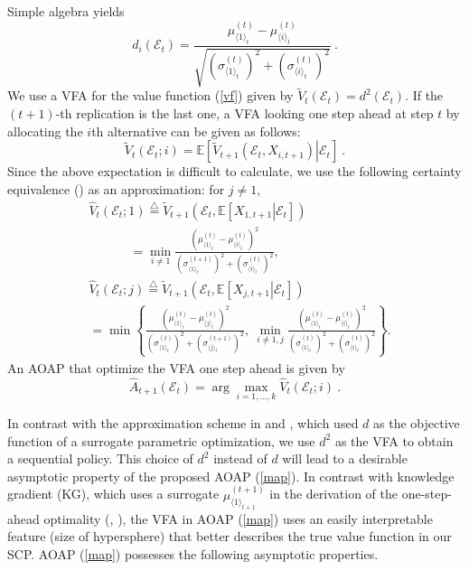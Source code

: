 \documentclass[journal]{IEEEtran}
\newcommand{\ed}{\stackrel{\triangle}{=}}
\begin{document}
Simple algebra yields 
$$d_i(\mathcal{E}_t) =\frac{\mu_{\langle 1 \rangle_t}^{(t)}-\mu_{\langle i \rangle_t}^{(t)}}{\sqrt{\left(\sigma_{\langle 1 \rangle_t}^{(t)}\right)^2+\left(\sigma_{\langle i \rangle_t}^{(t)}\right)^2}}~.$$
We use a VFA for the value function (\ref{vf}) given by $\widetilde{V}_t(\mathcal{E}_t)=d^2(\mathcal{E}_t)$. 
If the $(t+1)$-th replication is the last one, a VFA looking one step ahead at step $t$ by allocating the $i$th alternative can be given as follows:
\begin{equation*}\widetilde{V}_t(\mathcal{E}_t;i)=\left.\mathbb{E}\left[ \widetilde{V}_{t+1}(\mathcal{E}_{t}, X_{i,t+1})\right|\mathcal{E}_{t}\right]~.\end{equation*}
Since the above expectation is difficult to calculate, we use the following certainty equivalence (\cite{bertsekas2005dynamic}) as an approximation: for $ j\neq 1$,
\begin{equation}\label{ax}
\begin{aligned}
 &\widehat{V}_{t}(\mathcal{E}_{t};1)\ed\widetilde{V}_{t+1}\left(\mathcal{E}_{t}, \left.\mathbb{E}\left[X_{1,t+1}\right|\mathcal{E}_{t}\right]\right)\\
 &\qquad\quad~=\min_{i\neq 1}\frac{\left(\mu_{\langle 1 \rangle_t}^{(t)}-\mu_{\langle i \rangle_t}^{(t)}\right)^2}{\left(\sigma_{\langle 1 \rangle_t}^{(t+1)}\right)^2+\left(\sigma_{\langle i \rangle_t}^{(t)}\right)^2},\\
 &\widehat{V}_{t}(\mathcal{E}_{t};j)\ed\widetilde{V}_{t+1}\left(\mathcal{E}_{t}, \left.\mathbb{E}\left[X_{j,t+1}\right|\mathcal{E}_{t}\right]\right)\\
 &=\min\left\{\frac{\left(\mu_{\langle 1 \rangle_t}^{(t)}-\mu_{\langle j\rangle_t}^{(t)}\right)^2}{\left(\sigma_{\langle 1 \rangle_t}^{(t)}\right)^2+\left(\sigma_{\langle j\rangle_t}^{(t+1)}\right)^2},~\min_{i\neq 1,j}\frac{\left(\mu_{\langle 1 \rangle_t}^{(t)}-\mu_{\langle i \rangle_t}^{(t)}\right)^2}{\left(\sigma_{\langle 1 \rangle_t}^{(t)}\right)^2+\left(\sigma_{\langle i \rangle_t}^{(t)}\right)^2}\right\}.
\end{aligned}
\end{equation}
An AOAP that optimize the VFA one step ahead is given by 
\begin{equation}\label{map}\widehat{A}_{t+1}(\mathcal{E}_{t})=\arg\max_{i=1,\ldots,k}\widehat{V}_{t}(\mathcal{E}_{t};i)~.\end{equation}
 

In contrast with the approximation scheme in \cite{fu2007simulation} and \cite{peng2012efficient}, which used $d$ as the objective function of a surrogate parametric optimization,  we use $d^2$ as the VFA to obtain a sequential policy. This choice of $d^2$ instead of $d$ will lead to a desirable asymptotic property of the proposed AOAP  (\ref{map}). 
In contrast with knowledge gradient (KG), which uses a surrogate $\mu_{\langle 1 \rangle_{t+1}}^{(t+1)}$ in the derivation of the one-step-ahead optimality (\cite{gupta1996bayesian}, \cite{frazier2008knowledge}),  the VFA in AOAP (\ref{map}) uses an easily interpretable feature (size of hypersphere) that better describes the true value function in our SCP.  AOAP (\ref{map}) possesses the following asymptotic properties. 
\end{document}
